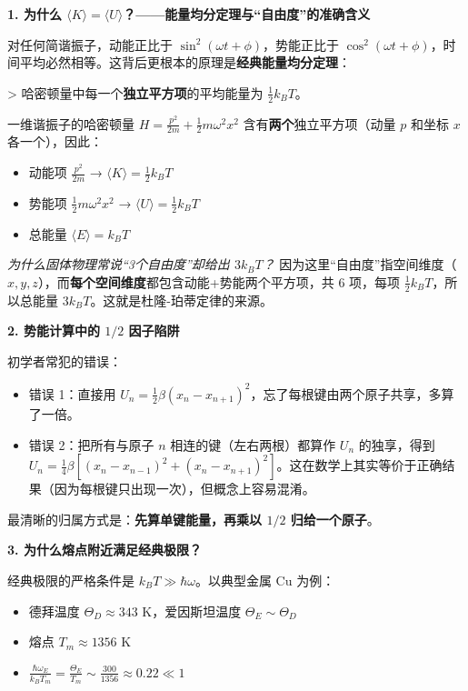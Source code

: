\begin{insightbox}[物理图像与深层联系]
\textbf{1. 为什么 $\langle K\rangle=\langle U\rangle$？——能量均分定理与``自由度''的准确含义}

对任何简谐振子，动能正比于 $\sin^2(\omega t+\phi)$，势能正比于 $\cos^2(\omega t+\phi)$，时间平均必然相等。这背后更根本的原理是\textbf{经典能量均分定理}：

> 哈密顿量中每一个\textbf{独立平方项}的平均能量为 $\frac12 k_BT$。

一维谐振子的哈密顿量 $H=\frac{p^2}{2m}+\frac12 m\omega^2 x^2$ 含有\textbf{两个}独立平方项（动量 $p$ 和坐标 $x$ 各一个），因此：
\begin{itemize}
    \item 动能项 $\frac{p^2}{2m}$ → $\langle K\rangle = \frac12 k_BT$
    \item 势能项 $\frac12 m\omega^2 x^2$ → $\langle U\rangle = \frac12 k_BT$
    \item 总能量 $\langle E\rangle = k_BT$
\end{itemize}

\textit{为什么固体物理常说``3个自由度''却给出 $3k_BT$？} 因为这里``自由度''指空间维度（$x,y,z$），而\textbf{每个空间维度}都包含动能+势能两个平方项，共 6 项，每项 $\frac12 k_BT$，所以总能量 $3k_BT$。这就是杜隆-珀蒂定律的来源。

\textbf{2. 势能计算中的 $1/2$ 因子陷阱}

初学者常犯的错误：
\begin{itemize}
    \item 错误 1：直接用 $U_n=\frac12\beta(x_n-x_{n+1})^2$，忘了每根键由两个原子共享，多算了一倍。
    \item 错误 2：把所有与原子 $n$ 相连的键（左右两根）都算作 $U_n$ 的独享，得到 $U_n=\frac14\beta[(x_n-x_{n-1})^2+(x_n-x_{n+1})^2]$。这在数学上其实等价于正确结果（因为每根键只出现一次），但概念上容易混淆。
\end{itemize}
最清晰的归属方式是：\textbf{先算单键能量，再乘以 $1/2$ 归给一个原子}。

\textbf{3. 为什么熔点附近满足经典极限？}

经典极限的严格条件是 $k_BT \gg \hbar\omega$。以典型金属 Cu 为例：
\begin{itemize}
    \item 德拜温度 $\Theta_D \approx 343$ K，爱因斯坦温度 $\Theta_E\sim\Theta_D$
    \item 熔点 $T_m \approx 1356$ K
    \item $\displaystyle\frac{\hbar\omega_E}{k_BT_m} = \frac{\Theta_E}{T_m} \sim \frac{300}{1356} \approx 0.22 \ll 1$
\end{itemize}


\end{insightbox}
